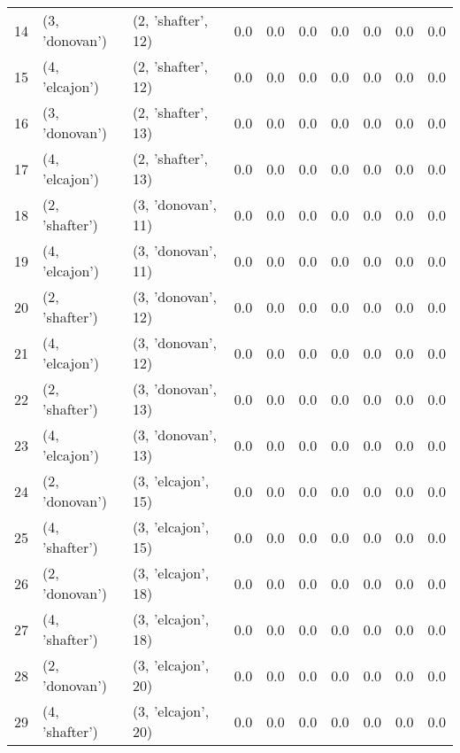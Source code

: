 \begin{tabular}{lllrrrrrrr}
14 &   (3, 'donovan') &  (2, 'shafter', 12) &      0.0 &        0.0 &      0.0 &      0.0 &      0.0 &        0.0 &       0.0 \\
15 &   (4, 'elcajon') &  (2, 'shafter', 12) &      0.0 &        0.0 &      0.0 &      0.0 &      0.0 &        0.0 &       0.0 \\
16 &   (3, 'donovan') &  (2, 'shafter', 13) &      0.0 &        0.0 &      0.0 &      0.0 &      0.0 &        0.0 &       0.0 \\
17 &   (4, 'elcajon') &  (2, 'shafter', 13) &      0.0 &        0.0 &      0.0 &      0.0 &      0.0 &        0.0 &       0.0 \\
18 &   (2, 'shafter') &  (3, 'donovan', 11) &      0.0 &        0.0 &      0.0 &      0.0 &      0.0 &        0.0 &       0.0 \\
19 &   (4, 'elcajon') &  (3, 'donovan', 11) &      0.0 &        0.0 &      0.0 &      0.0 &      0.0 &        0.0 &       0.0 \\
20 &   (2, 'shafter') &  (3, 'donovan', 12) &      0.0 &        0.0 &      0.0 &      0.0 &      0.0 &        0.0 &       0.0 \\
21 &   (4, 'elcajon') &  (3, 'donovan', 12) &      0.0 &        0.0 &      0.0 &      0.0 &      0.0 &        0.0 &       0.0 \\
22 &   (2, 'shafter') &  (3, 'donovan', 13) &      0.0 &        0.0 &      0.0 &      0.0 &      0.0 &        0.0 &       0.0 \\
23 &   (4, 'elcajon') &  (3, 'donovan', 13) &      0.0 &        0.0 &      0.0 &      0.0 &      0.0 &        0.0 &       0.0 \\
24 &   (2, 'donovan') &  (3, 'elcajon', 15) &      0.0 &        0.0 &      0.0 &      0.0 &      0.0 &        0.0 &       0.0 \\
25 &   (4, 'shafter') &  (3, 'elcajon', 15) &      0.0 &        0.0 &      0.0 &      0.0 &      0.0 &        0.0 &       0.0 \\
26 &   (2, 'donovan') &  (3, 'elcajon', 18) &      0.0 &        0.0 &      0.0 &      0.0 &      0.0 &        0.0 &       0.0 \\
27 &   (4, 'shafter') &  (3, 'elcajon', 18) &      0.0 &        0.0 &      0.0 &      0.0 &      0.0 &        0.0 &       0.0 \\
28 &   (2, 'donovan') &  (3, 'elcajon', 20) &      0.0 &        0.0 &      0.0 &      0.0 &      0.0 &        0.0 &       0.0 \\
29 &   (4, 'shafter') &  (3, 'elcajon', 20) &      0.0 &        0.0 &      0.0 &      0.0 &      0.0 &        0.0 &       0.0 \\

\end{tabular}

